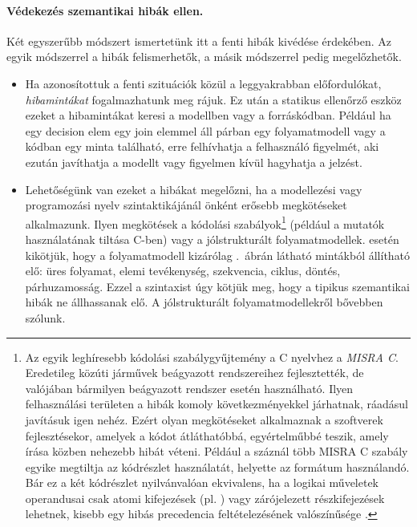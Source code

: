 \paragraph{Védekezés szemantikai hibák ellen.}
Két egyszerűbb módszert ismertetünk itt a fenti hibák kivédése érdekében. Az egyik módszerrel a hibák felismerhetők, a másik módszerrel pedig megelőzhetők.

\begin{itemize}
	\item Ha azonosítottuk a fenti szituációk közül a leggyakrabban előfordulókat, \emph{hibamintákat} fogalmazhatunk meg rájuk. Ez után a statikus ellenőrző eszköz ezeket a hibamintákat keresi a modellben vagy a forráskódban. Például ha egy decision elem egy join elemmel áll párban egy folyamatmodell vagy a kódban egy  minta található, erre felhívhatja a felhasználó figyelmét, aki ezután javíthatja a modellt vagy figyelmen kívül hagyhatja a jelzést.

	\item Lehetőségünk van ezeket a hibákat megelőzni, ha a modellezési vagy programozási nyelv szintaktikájánál önként erősebb megkötéseket alkalmazunk. Ilyen megkötések a kódolási szabályok\footnote{Az egyik leghíresebb kódolási szabálygyűjtemény a C nyelvhez a \emph{MISRA C}. Eredetileg közúti járművek beágyazott rendszereihez fejlesztették, de valójában bármilyen beágyazott rendszer esetén használható. Ilyen felhasználási területen a hibák komoly következményekkel járhatnak, ráadásul javításuk igen nehéz. Ezért olyan megkötéseket alkalmaznak a szoftverek fejlesztésekor, amelyek a kódot átláthatóbbá, egyértelműbbé teszik, amely írása közben nehezebb hibát véteni. Például a száznál több MISRA C szabály egyike megtiltja az  kódrészlet használatát, helyette az  formátum használandó. Bár ez a két kódrészlet nyilvánvalóan ekvivalens, ha a logikai műveletek operandusai csak atomi kifejezések (pl. ) vagy zárójelezett részkifejezések lehetnek, kisebb egy hibás precedencia feltételezésének valószínűsége \cite{Wong:2003}.\kiegeszitoanyag} (például a mutatók használatának tiltása C-ben) vagy a jólstrukturált folyamatmodellek.  esetén kikötjük, hogy a folyamatmodell kizárólag .~ábrán látható mintákból állítható elő: üres folyamat, elemi tevékenység, szekvencia, ciklus, döntés, párhuzamosság. Ezzel a szintaxist úgy kötjük meg, hogy a tipikus szemantikai hibák ne állhassanak elő. A jólstrukturált folyamatmodellekről bővebben  szólunk.
\end{itemize}

